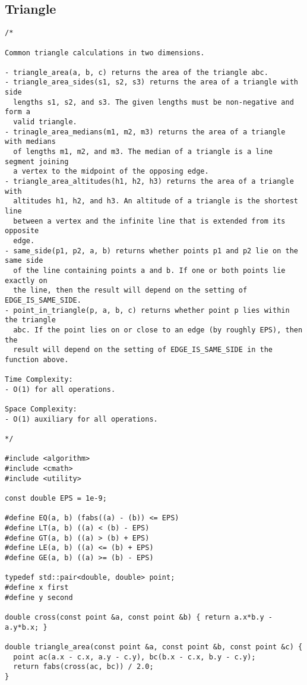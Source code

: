 \subsection{Triangle}
\begin{lstlisting}
/*

Common triangle calculations in two dimensions.

- triangle_area(a, b, c) returns the area of the triangle abc.
- triangle_area_sides(s1, s2, s3) returns the area of a triangle with side
  lengths s1, s2, and s3. The given lengths must be non-negative and form a
  valid triangle.
- trinagle_area_medians(m1, m2, m3) returns the area of a triangle with medians
  of lengths m1, m2, and m3. The median of a triangle is a line segment joining
  a vertex to the midpoint of the opposing edge.
- triangle_area_altitudes(h1, h2, h3) returns the area of a triangle with
  altitudes h1, h2, and h3. An altitude of a triangle is the shortest line
  between a vertex and the infinite line that is extended from its opposite
  edge.
- same_side(p1, p2, a, b) returns whether points p1 and p2 lie on the same side
  of the line containing points a and b. If one or both points lie exactly on
  the line, then the result will depend on the setting of EDGE_IS_SAME_SIDE.
- point_in_triangle(p, a, b, c) returns whether point p lies within the triangle
  abc. If the point lies on or close to an edge (by roughly EPS), then the
  result will depend on the setting of EDGE_IS_SAME_SIDE in the function above.

Time Complexity:
- O(1) for all operations.

Space Complexity:
- O(1) auxiliary for all operations.

*/

#include <algorithm>
#include <cmath>
#include <utility>

const double EPS = 1e-9;

#define EQ(a, b) (fabs((a) - (b)) <= EPS)
#define LT(a, b) ((a) < (b) - EPS)
#define GT(a, b) ((a) > (b) + EPS)
#define LE(a, b) ((a) <= (b) + EPS)
#define GE(a, b) ((a) >= (b) - EPS)

typedef std::pair<double, double> point;
#define x first
#define y second

double cross(const point &a, const point &b) { return a.x*b.y - a.y*b.x; }

double triangle_area(const point &a, const point &b, const point &c) {
  point ac(a.x - c.x, a.y - c.y), bc(b.x - c.x, b.y - c.y);
  return fabs(cross(ac, bc)) / 2.0;
}


\end{lstlisting}
